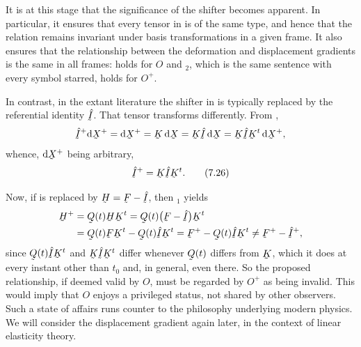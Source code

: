 It is at this stage that the significance of the shifter becomes
apparent. In particular, it ensures that every tensor in  is of
the same type, and hence that the relation remains invariant under basis
transformations in a given frame. It also ensures that the relationship
between the deformation and displacement gradients is the same in all
frames:  holds for $O$ and $_{2}$, which is the same
sentence with every symbol starred, holds for $O^{+}$.

In contrast, in the extant literature the shifter in  is
typically replaced by the referential identity $\hI$. That tensor
transforms differently. From ,
\[
   \hI^{+}\dl\bX^{+}=\dl\bX^{+}=\bK\,\dl\bX=\bK\hI\,\dl\bX
   =\bK\hI\bK^{t}\,\dl\bX^{+},
\]
whence, $\dl\bX^{+}$ being arbitrary,
\begin{equation}
   \hI^{+}=\bK\hI\bK^{t}.
   \tag{7.26}\label{eq:7.26}
\end{equation}

Now, if  is replaced by $\bH=\bF-\hI$, then
$_{1}$ yields
\[
\begin{aligned}
   \bH^{+}&=\bQ(t)\bH\bK^{t}=\bQ(t)\big(\bF-\hI\big)\bK^{t}
   \\
   &=\bQ(t)\bF\bK^{t}-\bQ(t)\hI\bK^{t}
   =\bF^{+}-\bQ(t)\hI\bK^{t}\neq\bF^{+}-\hI^{+},
\end{aligned}
\]
since $\bQ(t)\hI\bK^{t}$ and $\bK\hI\bK^{t}$ differ whenever
$\bQ(t)$ differs from $\bK$, which it does at every instant other than
$t_{0}$ and, in general, even there. So the proposed relationship, if
deemed valid by $O$, must be regarded by $O^{+}$ as being invalid. This
would imply that $O$ enjoys a privileged status, not shared by other
observers. Such a state of affairs runs counter to the philosophy
underlying modern physics. We will consider the displacement gradient
again later, in the context of linear elasticity theory.

